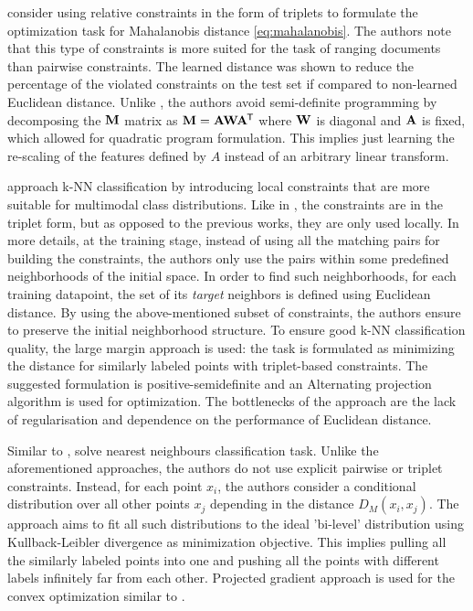 \citep{schultz2004learning} consider using relative constraints in the form of triplets to formulate the optimization task for Mahalanobis distance \ref{eq:mahalanobis}. The authors note that this type of constraints is more suited for the task of ranging documents than pairwise constraints. The learned distance was shown to reduce the percentage of the violated constraints on the test set if compared to non-learned Euclidean distance. Unlike \citep{xing2003distance}, the authors avoid semi-definite programming by
decomposing the $\bold{M}$ matrix as $\bold{M}=\bold{A}\bold{W}\bold{A}^{\mkern-1.5mu\mathsf{T}}$ where $\bold{W}$ is diagonal and $\bold{A}$ is fixed,  which allowed for quadratic program formulation. This implies just learning the re-scaling of the features defined by $A$ instead of an arbitrary linear transform. 

\citep{NIPS2005_2795} approach k-NN classification by introducing local constraints that are more suitable for multimodal class distributions. Like in \citep{schultz2004learning}, the constraints are in the triplet form, but as opposed to the previous works, they are only used  locally. In more details, at the training stage, instead of using all the matching pairs for building the constraints, the authors only use the pairs within some predefined neighborhoods of the initial space. In order to find such neighborhoods, for each training datapoint, the set of its \textit{target} neighbors is defined using Euclidean distance. By using the above-mentioned subset of constraints, the authors ensure to preserve the initial neighborhood structure. To ensure good k-NN classification quality, the large margin approach is used: the task is formulated as minimizing the distance for similarly labeled points with triplet-based constraints. The suggested formulation is positive-semidefinite and an  Alternating projection  algorithm is used for optimization. The bottlenecks of the approach are the lack of regularisation and dependence on the performance of Euclidean distance. %


Similar to \citep{NIPS2005_2795}, \citep{globerson2006metric} solve nearest neighbours classification task. Unlike the aforementioned approaches, the authors do not use explicit pairwise or triplet constraints. Instead, for each point $x_i$, the authors consider a conditional distribution over all other points $x_j$ depending in the distance $D_M(x_i, x_j)$. The approach aims to fit all such distributions to the ideal 'bi-level' distribution using Kullback-Leibler divergence as minimization objective. This implies pulling all the similarly labeled points into one and pushing all the points with different labels infinitely far from each other. Projected gradient approach is used for the convex optimization similar to \citep{xing2003distance}. %


